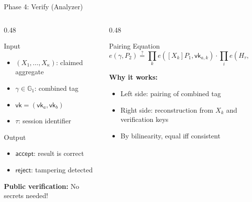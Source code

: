 \documentclass[aspectratio=169,10pt]{beamer}
\newcommand{\G}{\mathbb{G}}
\begin{document}
\begin{frame}{Phase 4: Verify (Analyzer)}
    \begin{columns}[T]
        \begin{column}{0.48\textwidth}
            \begin{alertblock}{Input}
                \begin{itemize}
                    \item $(X_1, \ldots, X_\kappa)$: claimed aggregate
                    \item $\gamma \in \G_1$: combined tag
                    \item $\mathsf{vk} = (\mathsf{vk}_a, \mathsf{vk}_b)$
                    \item $\tau$: session identifier
                \end{itemize}
            \end{alertblock}

            \begin{exampleblock}{Output}
                \begin{itemize}
                    \item $\mathsf{accept}$: result is correct
                    \item $\mathsf{reject}$: tampering detected
                \end{itemize}
            \end{exampleblock}

            \vspace{0.2em}
            \textbf{Public verification:} No secrets needed!
        \end{column}
        \begin{column}{0.48\textwidth}
            \begin{block}{Pairing Equation}
                {\small
                \[
                e(\gamma, P_2) \stackrel{?}{=} \prod_{k} e([X_k]P_1, \mathsf{vk}_{a,k}) \cdot \prod_{i} e(H_\tau, \mathsf{vk}_{b,i})
                \]}
            \end{block}

            \vspace{0.2em}
            \textbf{Why it works:}
            \begin{itemize}
                \item Left side: pairing of combined tag
                \item Right side: reconstruction from $X_k$ and verification keys
                \item By bilinearity, equal iff consistent
            \end{itemize}
        \end{column}
    \end{columns}
\end{frame}
\end{document}
